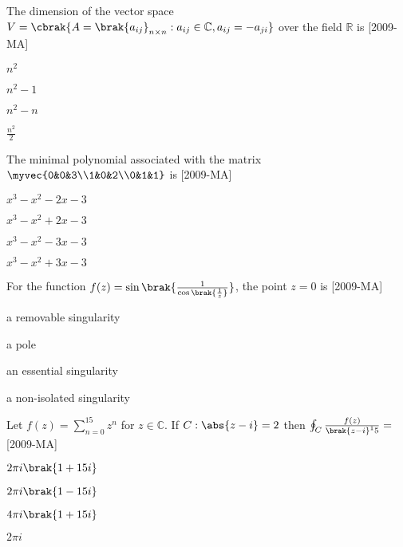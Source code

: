 \iffalse
    \title{Assignment}
    \author{EE24BTECH11066}
    \section{ma}
    \chapter{2009}
  \fi
\item The dimension of the vector space $V=\cbrak{A=\brak{a_{ij}}_{n \times n}: a_{ij} \in \mathbb C,a_{ij}=-a_{ji}}$ over the field $\mathbb R$ is \hfill{[2009-MA]}
\begin{enumerate}
\begin{multicols}{4}
\item $n^2$
\item $n^2-1$
\item $n^2-n$
\item $\frac{n^2}{2}$
\end{multicols}
\end{enumerate}

\item The minimal polynomial associated with the matrix $\myvec{0&0&3\\1&0&2\\0&1&1}$ is \hfill{[2009-MA]}
\begin{enumerate}
\begin{multicols}{2}
\item $x^3-x^2-2x-3$
\item $x^3-x^2+2x-3$
\item $x^3-x^2-3x-3$
\item $x^3-x^2+3x-3$
\end{multicols}
\end{enumerate}

\item For the function $f(z)=\sin \brak{\frac{1}{\cos \brak{\frac{1}{z}}}}$, the point $z=0$ is \hfill{[2009-MA]}
\begin{enumerate}
\begin{multicols}{2}
\item a removable singularity
\item a pole
\item an essential singularity
\item a non-isolated singularity
\end{multicols}
\end{enumerate}

\item Let $f(z)=\sum _{n=0}^{15} z^{n}$ for $z \in \mathbb C$. If $C:\abs{z-i}=2$ then $\oint_C
\frac{f(z)}{\brak{z-i}^15}=$ \hfill{[2009-MA]}
\begin{enumerate}
\begin{multicols}{4}
\item $2\pi i \brak{1+15i}$
\item $2\pi i \brak{1-15i}$
\item $4\pi i \brak{1+15i}$
\item $2\pi i$
\end{multicols}
\end{enumerate}

